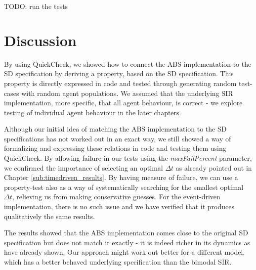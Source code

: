 TODO: run the tests

\section{Discussion}
By using QuickCheck, we showed how to connect the ABS implementation to the SD specification by deriving a property, based on the SD specification. This property is directly expressed in code and tested through generating random test-cases with random agent populations. We assumed that the underlying SIR implementation, more specific, that all agent behaviour, is correct - we explore testing of individual agent behaviour in the later chapters.

Although our initial idea of matching the ABS implementation to the SD specifications has not worked out in an exact way, we still showed a way of formalizing and expressing these relations in code and testing them using QuickCheck. By allowing failure in our tests using the \textit{maxFailPercent} parameter, we confirmed the importance of selecting an optimal $\Delta t$ as already pointed out in Chapter \ref{sub:timedriven_results}. By having measure of failure, we can use a property-test also as a way of systematically searching for the smallest optimal $\Delta t$, relieving us from making conservative guesses. For the event-driven implementation, there is no such issue and we have verified that it produces qualitatively the same results.

The results showed that the ABS implementation comes close to the original SD specification but does not match it exactly - it is indeed richer in its dynamics as \cite{macal_agent-based_2010, figueredo_comparing_2014} have already shown. Our approach might work out better for a different model, which has a better behaved underlying specification than the bimodal SIR. %